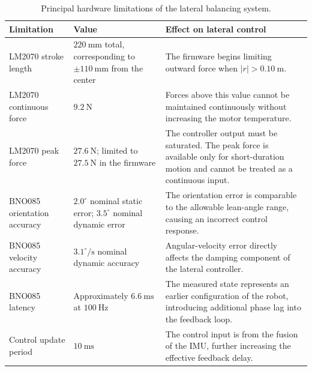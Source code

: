 \begin{table}[htbp]
  \centering
  \small
  \renewcommand{\arraystretch}{1.35}
  \caption{Principal hardware limitations of the lateral balancing system.}
  \label{tab:lateral-hardware-limitations}
  \begin{tabular}{
    p{}
    p{}
    p{}
  }
    \hline
    \textbf{Limitation}
    &
    \textbf{Value}
    &
    \textbf{Effect on lateral control}
    \\
    \hline

    LM2070 stroke length
    &
    $220~\mathrm{mm}$ total, corresponding to $\pm110~\mathrm{mm}$ from the center
    &
    The firmware begins limiting outward force when $|r|>0.10~\mathrm{m}$.
    \\

    LM2070 continuous force
    &
    $9.2~\mathrm{N}$
    &
    Forces above this value cannot be maintained continuously without increasing the motor temperature.
    \\

    LM2070 peak force
    &
    $27.6~\mathrm{N}$; limited to $27.5~\mathrm{N}$ in the firmware
    &
    The controller output must be saturated. The peak force is available only for short-duration motion and cannot be treated as a continuous input.
    \\

    BNO085 orientation accuracy
    &
    $2.0^\circ$ nominal static error; $3.5^\circ$ nominal dynamic error
    &
    The orientation error is comparable to the allowable lean-angle range, causing an incorrect control response.
    \\

    BNO085 velocity accuracy
    &
    $3.1^\circ/\mathrm{s}$ nominal dynamic accuracy
    &
    Angular-velocity error directly affects the damping component of the lateral controller.
    \\

    BNO085 latency
    &
    Approximately $6.6~\mathrm{ms}$ at $100~\mathrm{Hz}$
    &
    The measured state represents an earlier configuration of the robot, introducing additional phase lag into the feedback loop.
    \\

    Control update period
    &
    $10~\mathrm{ms}$
    &
    The control input is from the fusion of the IMU, further increasing the effective feedback delay.
    \\

    \hline
  \end{tabular}
\end{table}

